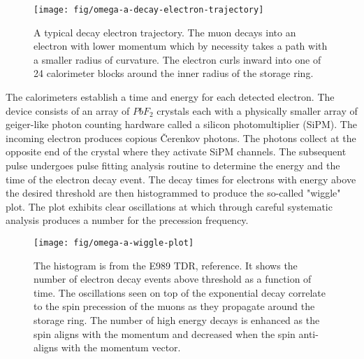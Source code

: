 \begin{figure}
\label{fig:omega-a-decay-electron-trajectory}
\texttt{[image: fig/omega-a-decay-electron-trajectory]}
\caption{A typical decay electron trajectory.  The muon decays into an electron with lower momentum which by necessity takes a path with a smaller radius of curvature.  The electron curls inward into one of 24 calorimeter blocks around the inner radius of the storage ring.}
\end{figure}

The calorimeters establish a time and energy for each detected electron.  The device consists of an array of $PbF_2$ crystals each with a physically smaller array of geiger-like photon counting hardware called a silicon photomultiplier (SiPM).  The incoming electron produces copious \v{C}erenkov photons.  The photons collect at the opposite end of the crystal where they activate SiPM channels.  The subsequent pulse undergoes pulse fitting analysis routine to determine the energy and the time of the electron decay event.  The decay times for electrons with energy above the desired threshold are then histogrammed to produce the so-called "wiggle" plot.  The plot exhibits clear oscillations at \wa which through careful systematic analysis produces a number for the precession frequency.

\begin{figure}
\label{fig:omega-a-wiggle-plot}
\texttt{[image: fig/omega-a-wiggle-plot]}
\caption{The histogram is from the E989 TDR, reference\cite{e989-tdr}.  It shows the number of electron decay events above threshold as a function of time.  The oscillations seen on top of the exponential decay correlate to the spin precession of the muons as they propagate around the storage ring.  The number of high energy decays is enhanced as the spin aligns with the momentum and decreased when the spin anti-aligns with the momentum vector.}
\end{figure}
